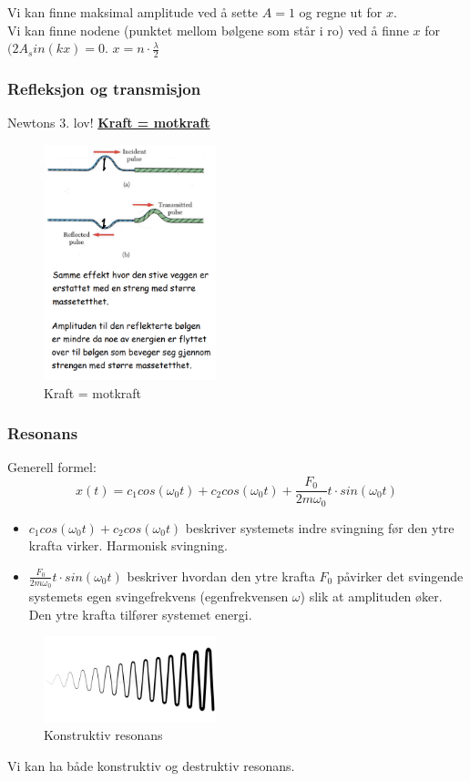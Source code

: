 \documentclass[12pt]{article}
\begin{document}
Vi kan finne maksimal amplitude ved å sette $A = 1$ og regne ut for $x$.\\
Vi kan finne nodene (punktet mellom bølgene som står i ro) ved å finne $x$ for $(2A_sin(kx) = 0$. $x = n\cdot \frac{\lambda}{2}$

\subsubsection{Refleksjon og transmisjon}
Newtons 3. lov! \underline{\textbf{Kraft = motkraft}}
\begin{figure} [H]
    \centering
    \includegraphics[width = 5cm]{images/bounce.png}
    \caption{Kraft = motkraft}
\end{figure}

\subsubsection{Resonans}
Generell formel:
$$x(t) =  c_1cos(\omega_0 t) + c_2cos(\omega_0 t) + \frac{F_0}{2m\omega_0}t\cdot sin(\omega_0t)$$
\begin{itemize}
    \item[] $c_1cos(\omega_0 t) + c_2cos(\omega_0 t)$ beskriver systemets indre svingning før den ytre krafta virker. Harmonisk svingning.
    \item[] $\frac{F_0}{2m\omega_0}t\cdot sin(\omega_0t)$ beskriver hvordan den ytre krafta $F_0$ påvirker det svingende systemets egen svingefrekvens (egenfrekvensen $\omega$) slik at amplituden øker. Den ytre krafta tilfører systemet energi.
\end{itemize}
\begin{figure} [H]
    \centering
    \includegraphics[width = 5cm]{images/resonans.jpg}
    \caption{Konstruktiv resonans}
\end{figure}
Vi kan ha både konstruktiv og destruktiv resonans.
\end{document}
